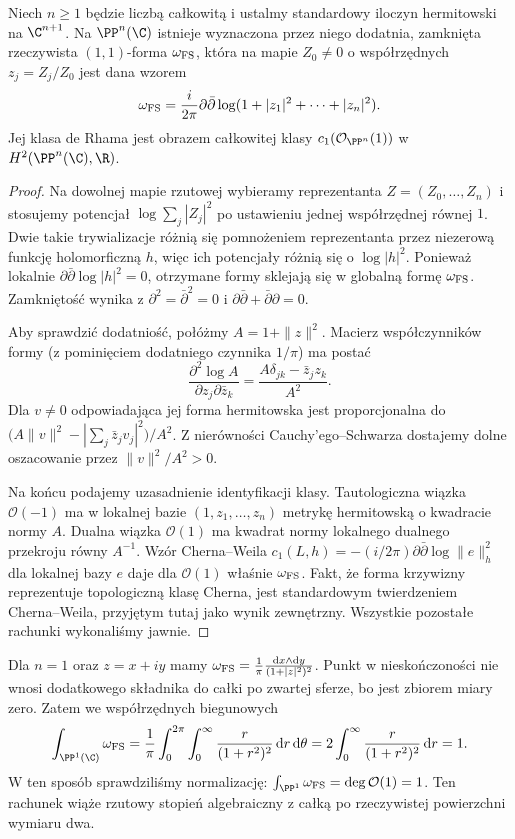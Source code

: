 \begin{twierdzenie}
\label{tw:ga9-fs}
Niech $n\ge1$ będzie liczbą całkowitą i ustalmy standardowy iloczyn
hermitowski na $\C^{n+1}$. Na $\PP^n(\C)$ istnieje
wyznaczona przez niego dodatnia,
zamknięta rzeczywista $(1,1)$-forma
$\omega_{\rm FS}$, która na mapie $Z_0\ne0$
o współrzędnych $z_j=Z_j/Z_0$ jest dana wzorem
\[
 \omega_{\rm FS}=\frac{i}{2\pi}\partial\bar\partial
 \log(1+|z_1|^2+\cdots+|z_n|^2).
\]
Jej klasa de Rhama jest obrazem całkowitej klasy
$c_1(\mathcal O_{\PP^n}(1))$ w $H^2(\PP^n(\C),\R)$.
\end{twierdzenie}
\begin{proof}
Na dowolnej mapie rzutowej wybieramy reprezentanta
$Z=(Z_0,\ldots,Z_n)$ i stosujemy potencjał
$\log\sum_j|Z_j|^2$ po ustawieniu jednej współrzędnej
równej $1$. Dwie takie trywializacje różnią się
pomnożeniem reprezentanta przez niezerową funkcję
holomorficzną $h$, więc ich potencjały różnią się
o $\log|h|^2$. Ponieważ lokalnie
$\partial\bar\partial\log|h|^2=0$, otrzymane formy
sklejają się w globalną formę $\omega_{\rm FS}$.
Zamkniętość wynika z $\partial^2=\bar\partial^2=0$
i $\partial\bar\partial+\bar\partial\partial=0$.

Aby sprawdzić dodatniość, połóżmy $A=1+\|z\|^2$.
Macierz współczynników formy (z pominięciem dodatniego
czynnika $1/\pi$) ma postać
\[
 \frac{\partial^2\log A}{\partial z_j\partial\bar z_k}
 =\frac{A\delta_{jk}-\bar z_j z_k}{A^2}.
\]
Dla $v\ne0$ odpowiadająca jej forma hermitowska
jest proporcjonalna do
$\big(A\|v\|^2-|\sum_j\bar z_jv_j|^2\big)/A^2$.
Z nierówności Cauchy'ego--Schwarza dostajemy dolne
oszacowanie przez $\|v\|^2/A^2>0$.

Na końcu podajemy uzasadnienie identyfikacji klasy.
Tautologiczna wiązka $\mathcal O(-1)$ ma w lokalnej
bazie $(1,z_1,\ldots,z_n)$ metrykę hermitowską
o kwadracie normy $A$. Dualna wiązka $\mathcal O(1)$
ma kwadrat normy lokalnego dualnego przekroju równy $A^{-1}$.
Wzór Cherna--Weila
$c_1(L,h)=-(i/2\pi)\partial\bar\partial\log\|e\|^2_h$
dla lokalnej bazy $e$ daje dla $\mathcal O(1)$
właśnie $\omega_{\rm FS}$. Fakt, że forma krzywizny
reprezentuje topologiczną klasę Cherna, jest
standardowym twierdzeniem Cherna--Weila, przyjętym
tutaj jako wynik zewnętrzny. Wszystkie pozostałe
rachunki wykonaliśmy jawnie.
\end{proof}

\begin{przyklad}
\label{prz:ga9-fs-integral}
Dla $n=1$ oraz $z=x+iy$ mamy
$\omega_{\rm FS}=\frac1\pi\frac{\mathrm dx\wedge\mathrm dy}
{(1+|z|^2)^2}$. Punkt w nieskończoności nie wnosi
dodatkowego składnika do całki po zwartej sferze,
bo jest zbiorem miary zero. Zatem we współrzędnych
biegunowych
\[
 \int_{\PP^1(\C)}\omega_{\rm FS}
 =\frac1\pi\int_0^{2\pi}\int_0^\infty
 \frac{r}{(1+r^2)^2}\,\mathrm dr\,\mathrm d\theta
 =2\int_0^\infty\frac{r}{(1+r^2)^2}\,\mathrm dr=1.
\]
W ten sposób sprawdziliśmy normalizację:
$\int_{\PP^1}\omega_{\rm FS}=\deg\mathcal O(1)=1$.
Ten rachunek wiąże rzutowy stopień algebraiczny
z całką po rzeczywistej powierzchni wymiaru dwa.
\end{przyklad}

